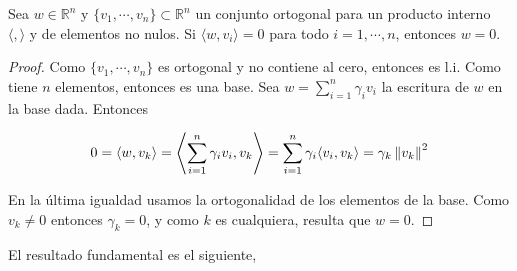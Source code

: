 \begin{lema}
\label{lema:zero}
Sea $w \in \mathbb{R}^n$ y $\{v_1, \cdots, v_n\} \subset \mathbb{R}^n$ un conjunto ortogonal para un producto interno $\langle, \rangle$ y de elementos no nulos. Si $\langle w, v_i \rangle = 0$ para todo $i = 1, \cdots, n$, entonces $w = 0$.

\begin{proof}
Como $\{v_1, \cdots, v_n\}$ es ortogonal y no contiene al cero, entonces es l.i. Como tiene $n$ elementos, entonces es una base. Sea $w = \sum_{i = 1}^n \gamma_i v_i$ la escritura de $w$ en la base dada. Entonces

\[0 = \langle w, v_k \rangle = \left\langle \sum_{i = 1}^n \gamma_i v_i, v_k \right\rangle = \sum_{i = 1}^n \gamma_i \langle v_i, v_k \rangle = \gamma_k \left\lVert v_k\right\rVert^2\]

En la última igualdad usamos la ortogonalidad de los elementos de la base. Como $v_k \neq 0$ entonces $\gamma_k = 0$, y como $k$ es cualquiera, resulta que $w = 0$.
\end{proof}
\end{lema}

El resultado fundamental es el siguiente,

